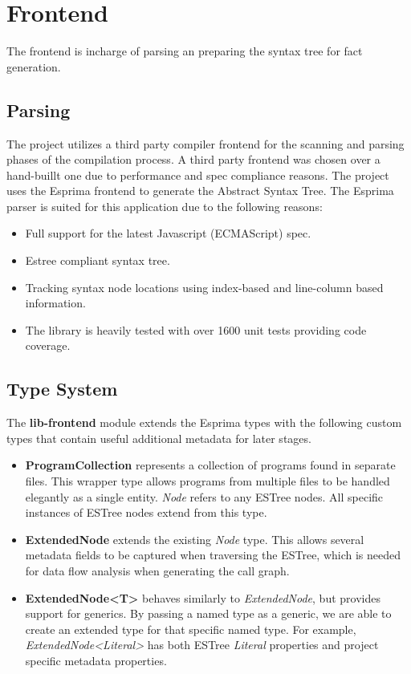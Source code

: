 \section{Frontend}

The frontend is incharge of parsing an preparing the syntax tree for fact generation.

\subsection{Parsing}

The project utilizes a third party compiler frontend for the scanning and parsing phases of the compilation process. A third party frontend was chosen over a hand-buillt one due to performance and spec compliance reasons. The project uses the Esprima\parencite{esprima} frontend to generate the Abstract Syntax Tree. The Esprima parser is suited for this application due to the following reasons:
\begin{itemize}
    \item Full support for the latest Javascript (ECMAScript) spec.
    \item Estree\parencite{estree} compliant syntax tree.
    \item Tracking syntax node locations using index-based and line-column based information.
    \item The library is heavily tested  with over 1600 unit tests providing code coverage.
\end{itemize}

\subsection{Type System}

The \textbf{lib-frontend} module extends the Esprima types with the following custom types that contain useful additional metadata for later stages.

\begin{itemize}
    \item \textbf{ProgramCollection} represents a collection of programs found in separate files. This wrapper type allows programs from multiple files to be handled elegantly as a single entity. \textit{Node} refers to any ESTree nodes. All specific instances of ESTree nodes extend from this type. 
    \item \textbf{ExtendedNode} extends the existing \textit{Node} type. This allows several metadata fields to be captured when traversing the ESTree, which is needed for data flow analysis when generating the call graph.
    \item \textbf{ExtendedNode\textless T\textgreater} behaves similarly to \textit{ExtendedNode}, but provides support for generics. By passing a named type as a generic, we are able to create an extended type for that specific named type. For example, \textit{ExtendedNode\textless Literal\textgreater} has both ESTree \textit{Literal} properties and project specific metadata properties.
\end{itemize}


